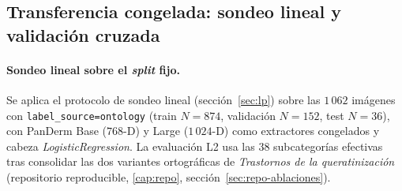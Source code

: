 \subsection{Transferencia congelada: sondeo lineal y validación cruzada}

\paragraph{Sondeo lineal sobre el \emph{split} fijo.}
Se aplica el protocolo de sondeo lineal (sección~\ref{sec:lp}) sobre
las $1\,062$ imágenes con \texttt{label\_source=ontology} (train
$N = 874$, validación $N = 152$, test $N = 36$), con PanDerm Base
($768$-D) y Large ($1\,024$-D) como extractores congelados y cabeza
\emph{LogisticRegression}. La evaluación L2 usa las $38$ subcategorías
efectivas tras consolidar las dos variantes ortográficas de
\emph{Trastornos de la queratinización} (repositorio reproducible,
\ref{cap:repo}, sección~\ref{sec:repo-ablaciones}).

